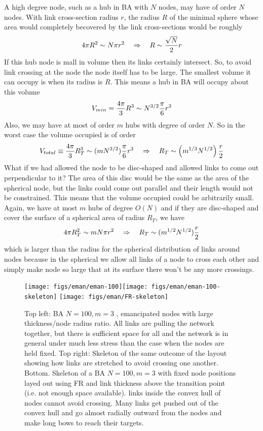 \documentclass[nofootinbib,preprint,floatfix,titlepage,superscriptaddress]{revtex4} %
\begin{document}
A high degree node, such as a hub in BA with $N$ nodes, may have of order $N$ nodes. With link cross-section radius $r$, the radius $R$ of the minimal sphere whose area would completely becovered by the link cross-sections would be roughly 
\[4 \pi R^2 \sim N \pi r^2 \quad \Rightarrow \quad R \sim {\sqrt{N}\over 2} r \]
If this hub node is mall in volume then its links certainly intersect. So, to avoid link crossing at the node the node itself has to be large. The smallest volume it can occupy is when its radius is $R$. This means a hub in BA will occupy about this volume
\[V_{min} = {4\pi\over 3} R^3 \sim N^{3/2} {\pi\over 6 } r^3 \]
Also, we may have at most of order $m$ hubs with degree of order $N$. So in the worst case the volume occupied is of order
\[V_{total} \equiv {4\pi \over 3} R_T^3 \sim (mN^{3/2}) {\pi\over 6 }r^3 \quad \Rightarrow  \quad R_T \sim \left(m^{1/3} N^{1/2}\right) {r\over 2 } \]
What if we had allowed the node to be disc-shaped and allowed links to come out perpendicular to it? The area of this disc would be the same as the area of the spherical node, but the links could come out parallel and their length would not be constrained. This means that the volume occupied could be arbitrarily small. Again, we have at most $m$ hubs of degree $O(N)$ and if they are disc-shaped and cover the surface of a spherical area of radius $R_T$, we have
\[4\pi R_T^2 \sim m N \pi r^2\quad \Rightarrow\quad  R_T \sim (m^{1/2} N^{1/2}) {r\over 2} \]
which is larger than the radius for the spherical distribution of links around nodes because in the spherical we allow all links of a node to cross each other and simply make node so large that at its surface there won't be any more crossings. 



\begin{figure}
    \centering
    \texttt{[image: figs/eman/eman-100]}\texttt{[image: figs/eman/eman-100-skeleton]}   
    \texttt{[image: figs/eman/FR-skeleton]}
    
    \caption{Top left: BA $N=100, m=3$ , emancipated nodes with large thickness/node radius ratio. All links are pulling the network together, but there is sufficient space for all and the network is in general under much less stress than the case when the nodes are held fixed. Top right: Skeleton of the same outcome of the layout showing how links are stretched to avoid crossing one another. Bottom. Skeleton of a BA $N=100,m=3$ with fixed node positions layed out using FR and link thickness above the transition point (i.e. not enough space available). links inside the convex hull of nodes cannot avoid crossing. Many links get pushed out of the convex hull and go almost radially outward from the nodes and make long bows to reach their targets.    }
    \label{fig:skeletons}
\end{figure}
\end{document}
